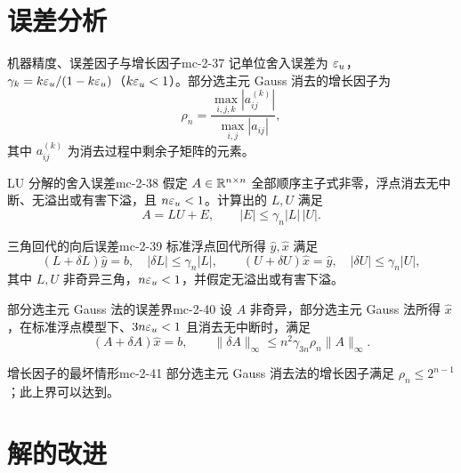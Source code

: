 \section{误差分析}

\begin{definition}{机器精度、误差因子与增长因子}{mc-2-37}
记单位舍入误差为 $\varepsilon_u$，$\gamma_k=k\varepsilon_u/(1-k\varepsilon_u)$（$k\varepsilon_u<1$）。部分选主元 Gauss 消去的增长因子为
\[\rho_n=\frac{\max_{i,j,k}|a_{ij}^{(k)}|}{\max_{i,j}|a_{ij}|},\]
其中 $a_{ij}^{(k)}$ 为消去过程中剩余子矩阵的元素。
\end{definition}

\begin{theorem}{LU 分解的舍入误差}{mc-2-38}
假定 $A\in\mathbb{R}^{n\times n}$ 全部顺序主子式非零，浮点消去无中断、无溢出或有害下溢，且 $n\varepsilon_u<1$。计算出的 $L,U$ 满足
\[A=LU+E,\qquad|E|\leq\gamma_n|L|\,|U|.\]
\end{theorem}

\begin{lemma}{三角回代的向后误差}{mc-2-39}
标准浮点回代所得 $\widehat y,\widehat x$ 满足
\[(L+\delta L)\widehat y=b,\quad|\delta L|\leq\gamma_n|L|,\qquad
(U+\delta U)\widehat x=\widehat y,\quad|\delta U|\leq\gamma_n|U|,\]
其中 $L,U$ 非奇异三角，$n\varepsilon_u<1$，并假定无溢出或有害下溢。
\end{lemma}

\begin{theorem}{部分选主元 Gauss 法的误差界}{mc-2-40}
设 $A$ 非奇异，部分选主元 Gauss 法所得 $\widehat x$，在标准浮点模型下、$3n\varepsilon_u<1$ 且消去无中断时，满足
\[(A+\delta A)\widehat x=b,\qquad\|\delta A\|_\infty\leq n^2\gamma_{3n}\rho_n\|A\|_\infty.\]
\end{theorem}

\begin{theorem}{增长因子的最坏情形}{mc-2-41}
部分选主元 Gauss 消去法的增长因子满足 $\rho_n\leq2^{n-1}$；此上界可以达到。
\end{theorem}

\section{解的改进}

